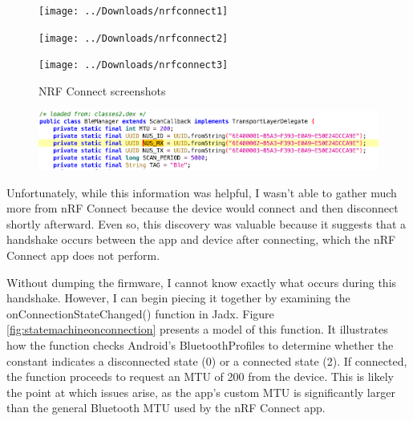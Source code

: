 \begin{figure}[H]
	\centering
	
	\begin{minipage}{0.32\textwidth}
		\centering
		\texttt{[image: ../Downloads/nrfconnect1]}
		\caption*{}
		\label{fig:nrfconnect1}
	\end{minipage}
	\hfill
	\begin{minipage}{0.32\textwidth}
		\centering
		\texttt{[image: ../Downloads/nrfconnect2]}
		\caption*{}
		\label{fig:nrfconnect2}
	\end{minipage}
	\hfill
	\begin{minipage}{0.32\textwidth}
		\centering
		\texttt{[image: ../Downloads/nrfconnect3]}
		\caption*{}
		\label{fig:nrfconnect3}
	\end{minipage}
	
	\caption{NRF Connect screenshots}
	\label{fig:nrfconnect_all}
\end{figure}

\begin{figure}[H]
	\centering
	\includegraphics[scale=.8]{bleuuidjadx}
	\caption{}
	\label{fig:bleuuidjadx}
\end{figure}
Unfortunately, while this information was helpful, I wasn’t able to gather much more from nRF Connect because the device would connect and then disconnect shortly afterward. Even so, this discovery was valuable because it suggests that a handshake occurs between the app and device after connecting, which the nRF Connect app does not perform.

Without dumping the firmware, I cannot know exactly what occurs during this handshake. However, I can begin piecing it together by examining the onConnectionStateChanged() function in Jadx. Figure \ref*{fig:statemachineonconnection} presents a model of this function. It illustrates how the function checks Android’s BluetoothProfiles to determine whether the constant indicates a disconnected state (0) or a connected state (2). If connected, the function proceeds to request an MTU of 200 from the device. This is likely the point at which issues arise, as the app’s custom MTU is significantly larger than the general Bluetooth MTU used by the nRF Connect app.

